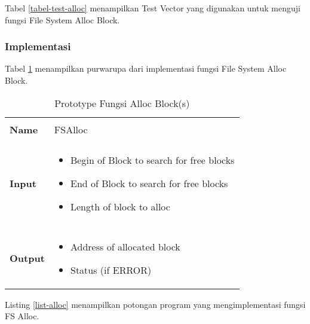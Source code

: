 Tabel \ref{tabel-test-alloc} menampilkan Test Vector yang digunakan untuk menguji fungsi File System Alloc Block.

\subsubsection{Implementasi}

Tabel \ref{tabel-alloc} menampilkan purwarupa dari implementasi fungsi File System Alloc Block. 

\begin{table}[h]
  \centering
  \begin{tabular}{p{2cm} p{8cm}}
    \hline\\
    {\bf Name} & FSAlloc\\
    \hline\\
    {\bf Input} & 
    \begin{itemize}[noitemsep,topsep=0pt,parsep=0pt,partopsep=0pt]
    \item Begin of Block to search for free blocks
    \item End of Block to search for free blocks
    \item Length of block to alloc
    \end{itemize}
    \\
    \hline\\
    {\bf Output} & 
    \begin{itemize}[noitemsep,topsep=0pt,parsep=0pt,partopsep=0pt]
    \item Address of allocated block
    \item Status (if ERROR)
    \end{itemize}
    \\
    \hline
  \end{tabular}
  \caption{Prototype Fungsi Alloc Block(s)}
  \label{tabel-alloc}
\end{table}

Listing \ref{list-alloc} menampilkan potongan program yang mengimplementasi fungsi FS Alloc.

